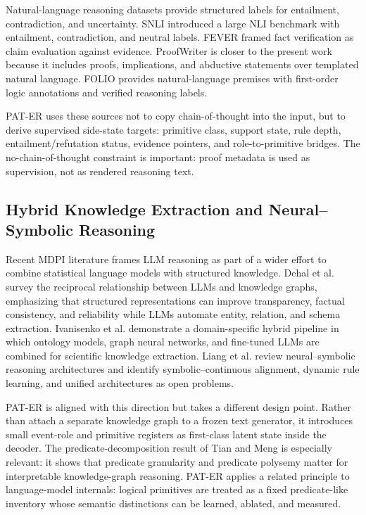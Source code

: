 Natural-language reasoning datasets provide structured labels for entailment,
contradiction, and uncertainty. SNLI \citep{bowman2015snli} introduced a large
NLI benchmark with entailment, contradiction, and neutral labels. FEVER
\citep{thorne2018fever} framed fact verification as claim evaluation against
evidence. ProofWriter \citep{tafjord2021proofwriter} is closer to the present
work because it includes proofs, implications, and abductive statements over
templated natural language. FOLIO \citep{han2024folio} provides natural-language
premises with first-order logic annotations and verified reasoning labels.

PAT-ER uses these sources not to copy chain-of-thought into the input, but to
derive supervised side-state targets: primitive class, support state, rule
depth, entailment/refutation status, evidence pointers, and role-to-primitive
bridges. The no-chain-of-thought constraint is important: proof metadata is used
as supervision, not as rendered reasoning text.

\subsection{Hybrid Knowledge Extraction and Neural--Symbolic Reasoning}

Recent MDPI literature frames LLM reasoning as part of a wider effort to combine
statistical language models with structured knowledge. Dehal et al.
\citep{dehal2025kgllm} survey the reciprocal relationship between LLMs and
knowledge graphs, emphasizing that structured representations can improve
transparency, factual consistency, and reliability while LLMs automate entity,
relation, and schema extraction. Ivanisenko et al.
\citep{ivanisenko2024knowledgeextraction} demonstrate a domain-specific hybrid
pipeline in which ontology models, graph neural networks, and fine-tuned LLMs
are combined for scientific knowledge extraction. Liang et al.
\citep{liang2025neurosymbolic} review neural--symbolic reasoning architectures
and identify symbolic--continuous alignment, dynamic rule learning, and unified
architectures as open problems.

PAT-ER is aligned with this direction but takes a different design point. Rather
than attach a separate knowledge graph to a frozen text generator, it introduces
small event-role and primitive registers as first-class latent state inside the
decoder. The predicate-decomposition result of Tian and Meng
\citep{tian2024pdec} is especially relevant: it shows that predicate granularity
and predicate polysemy matter for interpretable knowledge-graph reasoning. PAT-ER
applies a related principle to language-model internals: logical primitives are
treated as a fixed predicate-like inventory whose semantic distinctions can be
learned, ablated, and measured.

